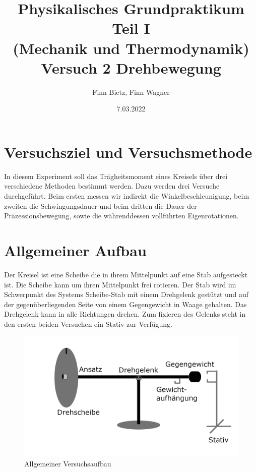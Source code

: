 \documentclass{article}
\date{7.03.2022}
\title{Physikalisches Grundpraktikum Teil I \\ (Mechanik und Thermodynamik) \\ Versuch 2 Drehbewegung}
\author{Finn Bietz, Finn Wagner}
\begin{document}
	
	\maketitle

	\section{Versuchsziel und Versuchsmethode}
		In diesem Experiment soll das Trägheitsmoment eines Kreisels über drei verschiedene Methoden bestimmt werden.
		Dazu werden drei Versuche durchgeführt. Beim ersten messen wir indirekt die Winkelbeschleunigung, beim zweiten die Schwingungsdauer
		und beim dritten die Dauer der Präzessionsbewegung, sowie die währenddessen vollführten Eigenrotationen.
			
	\section{Allgemeiner Aufbau}
		Der Kreisel ist eine Scheibe die in ihrem Mittelpunkt auf eine Stab aufgesteckt ist. Die Scheibe kann um ihren Mittelpunkt frei rotieren.
		Der Stab wird im Schwerpunkt des Systems Scheibe-Stab mit einem Drehgelenk gestützt und auf der gegenüberliegenden Seite von einem Gegengewicht in Waage gehalten.
		Das Drehgelenk kann in alle Richtungen drehen. Zum fixieren des Gelenks steht in den ersten beiden Versuchen ein Stativ zur Verfügung.
		\begin{figure}[!h]\label{fig:aufbau}
			\centering
			\includegraphics[width=\textwidth]{aufbau.png}
			\caption{Allgemeiner Versuchsaufbau}
		\end{figure}
\end{document}
